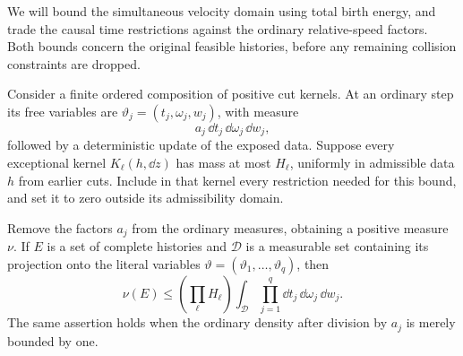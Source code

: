 We will bound the simultaneous velocity domain using total birth
energy, and trade the causal time restrictions against the ordinary
relative-speed factors. Both bounds concern the original feasible
histories, before any remaining collision constraints are dropped.

\begin{lemma}\label{lem:cutoff-extraction}
Consider a finite ordered composition of positive cut kernels.
At an ordinary step its free variables are
\(\vartheta_j=(t_j,\omega_j,w_j)\), with measure
\[
 a_j\,\dd t_j\,\dd\omega_j\,\dd w_j ,
\]
followed by a deterministic update of the exposed data.
Suppose every exceptional kernel \(K_\ell(h,\dd z)\) has mass
at most \(H_\ell\), uniformly in admissible data \(h\) from
earlier cuts.  Include in that kernel every restriction needed
for this bound, and set it to zero outside its admissibility
domain.

Remove the factors \(a_j\) from the ordinary measures, obtaining
a positive measure \(\nu\).  If \(E\) is a set of complete
histories and \(\mathcal D\) is a measurable set containing its
projection onto the literal variables
\(\vartheta=(\vartheta_1,\ldots,\vartheta_q)\), then
\begin{equation}\label{eq:cutoff-extraction}
 \nu(E)\leq
 \left(\prod_\ell H_\ell\right)
 \int_{\mathcal D}\prod_{j=1}^q
       \dd t_j\,\dd\omega_j\,\dd w_j .
\end{equation}
The same assertion holds when the ordinary density after division
by \(a_j\) is merely bounded by one.
\end{lemma}

